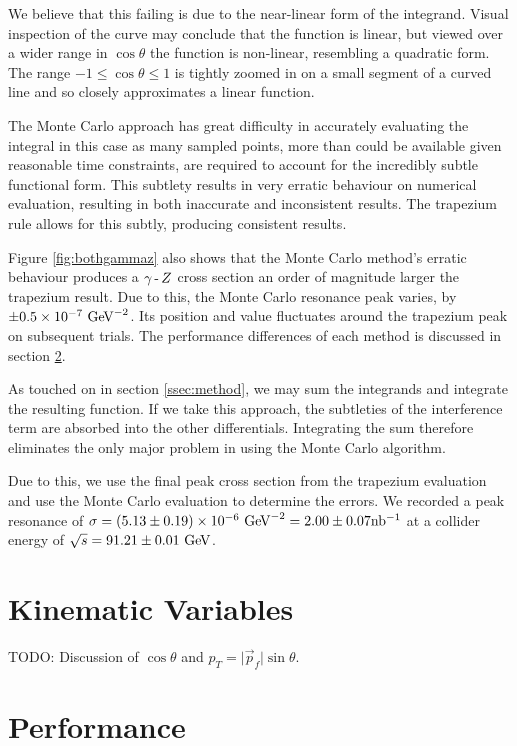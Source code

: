 \documentclass[]{article}
\providecommand{\e}[1]{\ensuremath{\times 10^{#1}}}
\begin{document}
We believe that this failing is due to the near-linear form of the integrand. Visual inspection of the curve may conclude that the function is linear, but viewed over a wider range in $\cos{\theta}$ the function is non-linear, resembling a quadratic form. The range $-1\leq\cos{\theta}\leq1$ is tightly zoomed in on a small segment of a curved line and so closely approximates a linear function.

The Monte Carlo approach has great difficulty in accurately evaluating the integral in this case as many sampled points, more than could be available given reasonable time constraints, are required to account for the incredibly subtle functional form. This subtlety results in very erratic behaviour on numerical evaluation, resulting in both inaccurate and inconsistent results. The trapezium rule allows for this subtly, producing consistent results.

Figure \ref{fig:bothgammaz} also shows that the Monte Carlo method's erratic behaviour produces a $\gamma\operatorname{-}Z $ cross section an order of magnitude larger the trapezium result. Due to this, the Monte Carlo resonance peak varies, by $\pm0.5\e{-7}\GeV^{-2}$. Its position and value fluctuates around the trapezium peak on subsequent trials. The performance differences of each method is discussed in section \ref{sec:performance}.

As touched on in section \ref{ssec:method}, we may sum the integrands and integrate the resulting function. If we take this approach, the subtleties of the interference term are absorbed into the other differentials. Integrating the sum therefore eliminates the only major problem in using the Monte Carlo algorithm.

Due to this, we use the final peak cross section from the trapezium evaluation and use the Monte Carlo evaluation to determine the errors. We recorded a peak resonance of $\sigma=(5.13\pm0.19)\e{-6}\GeV^{-2}=2.00\pm0.07\inb$ at a collider energy of $\sqrt{s}=91.21\pm0.01\GeV$.


\section{Kinematic Variables}\label{sec:variables}

TODO: Discussion of $\cos{\theta}$ and $p_{T} = \lvert\vec{p}_{f}\rvert\sin{\theta}$.


\section{Performance}\label{sec:performance}
\end{document}
